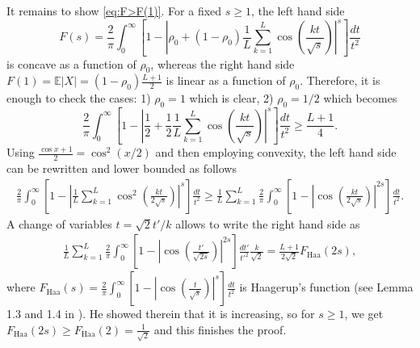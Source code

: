 \documentclass[10pt]{article}
\newcommand{\E}{\mathbb{E}}
\newcommand{\1}{\textbf{1}}
\theoremstyle{remark}
\theoremstyle{definition}
\begin{document}
It remains to show \eqref{eq:F>F(1)}. For a fixed $s \geq 1$, the left hand side
\[
F(s) = \frac{2}{\pi}\int_0^\infty\left[1 - \left|\rho_0 + (1-\rho_0)\frac{1}{L}\sum_{k=1}^L \cos\left(\frac{kt}{\sqrt{s}}\right)\right|^s\right]\frac{dt}{t^2}
\]
is concave as a function of $\rho_0$, whereas the right hand side $F(1) = \E|X| = (1-\rho_0)\frac{L+1}{2}$ is linear as a function of $\rho_0$. Therefore, it is enough to check the cases: 1) $\rho_0 = 1$ which is clear, 2) $\rho_0 = 1/2$ which becomes
\[
\frac{2}{\pi}\int_0^\infty\left[1 - \left|\frac{1}{2} + \frac{1}{2}\frac{1}{L}\sum_{k=1}^L \cos\left(\frac{kt}{\sqrt{s}}\right)\right|^s\right]\frac{dt}{t^2} \geq \frac{L+1}{4}.
\]
Using $\frac{\cos x +1}{2} = \cos^2(x/2)$ and then employing convexity, the left hand side can be rewritten and lower bounded as follows
\begin{align*}
\frac{2}{\pi}\int_0^\infty\left[1 - \left|\frac{1}{L}\sum_{k=1}^L \cos^2\left(\frac{kt}{2\sqrt{s}}\right)\right|^s\right]\frac{dt}{t^2} \geq \frac{1}{L}\sum_{k=1}^L\frac{2}{\pi}\int_0^\infty\left[1 - \left|\cos\left(\frac{kt}{2\sqrt{s}}\right)\right|^{2s}\right]\frac{dt}{t^2}.
\end{align*}
A change of variables $t = \sqrt{2}t'/k$ allows to write the right hand side as
\begin{align*}
\frac{1}{L}\sum_{k=1}^L\frac{2}{\pi}\int_0^\infty\left[1 - \left|\cos\left(\frac{t'}{\sqrt{2s}}\right)\right|^{2s}\right]\frac{dt'}{t'^2}\frac{k}{\sqrt{2}} = \frac{L+1}{2\sqrt{2}}F_{\text{Haa}}(2s),
\end{align*}
where $F_{\text{Haa}}(s) = \frac{2}{\pi}\int_0^\infty\left[1 - \left|\cos\left(\frac{t}{\sqrt{s}}\right)\right|^{s}\right]\frac{dt}{t^2}$ is Haagerup's function (see Lemma 1.3 and 1.4 in \cite{Haa}). He showed therein that it is increasing, so for $s \geq 1$, we get $F_{\text{Haa}}(2s) \geq F_{\text{Haa}}(2) = \frac{1}{\sqrt{2}}$ and this finishes the proof.
\end{document}
